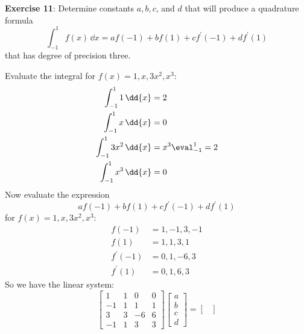 \documentclass{article}
\begin{document}
\textbf{Exercise 11}: Determine constants $a, b, c$, and $d$ that will produce a quadrature formula
    \begin{equation*}
        \int_{-1}^{1} f(x) \, \dd{x} = af(-1) + bf(1) + cf^{\prime}(-1) + df^{\prime}(1)
    \end{equation*}
that has degree of precision three.
    \begin{answer}
        Evaluate the integral for $f(x) = 1, x, 3x^{2}, x^{3}$:
            \begin{align*}
                \int_{-1}^{1} 1 \, \dd{x}      &= 2                        \\
                \int_{-1}^{1} x \, \dd{x}      &= 0                        \\
                \int_{-1}^{1} 3x^{2} \, \dd{x} &= x^{3} \eval_{-1}^{1} = 2 \\
                \int_{-1}^{1} x^{3} \, \dd{x}  &= 0                          
            \end{align*}
        Now evaluate the expression 
            \begin{equation*}
                af(-1) + bf(1) + cf^{\prime}(-1) + df^{\prime}(1)
            \end{equation*}
        for $f(x) = 1, x, 3x^{2}, x^{3}$:
            \begin{align*}
                f(-1)          &= 1, -1, 3, -1 \\
                f(1)           &= 1, 1, 3, 1   \\
                f^{\prime}(-1) &= 0, 1, -6, 3  \\
                f^{\prime}(1)  &= 0, 1, 6, 3     
            \end{align*}
        So we have the linear system:
            \begin{equation*}
                \begin{bmatrix}
                    1  & 1 & 0  & 0 \\
                    -1 & 1 & 1  & 1 \\
                    3  & 3 & -6 & 6 \\
                    -1 & 1 & 3  & 3   
                \end{bmatrix}\begin{bmatrix}
                    a \\
                    b \\
                    c \\
                    d   
                \end{bmatrix} = \begin{bmatrix}

\end{bmatrix}
\end{equation*}
\end{answer}
\end{document}
